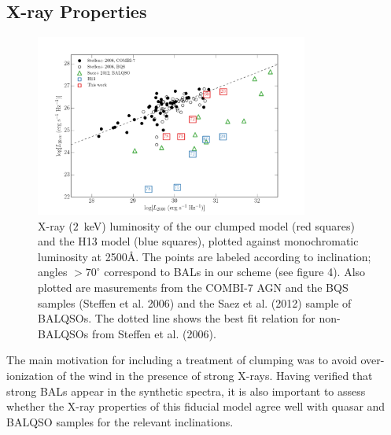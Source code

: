 \documentclass[useAMS,usenatbib]{mn2e_x}
\begin{document}


\subsection{X-ray Properties}
\label{sec:xray}


\begin{figure}
\centering
\includegraphics[width=0.8\textwidth]{figures/lx_a05_pre.png}
\caption
{
X-ray ($2$~keV) luminosity of the our clumped model (red squares) 
and the H13 model (blue squares), plotted against monochromatic luminosity 
at 2500\AA. The points are labeled according to inclination; angles
$>70^\circ$ correspond to BALs in our scheme (see figure 4).
Also plotted are masurements from 
the COMBI-7 AGN and the BQS samples (Steffen et al. 2006) and the Saez et al. (2012) 
sample of BALQSOs. The dotted line shows the best fit relation for non-BALQSOs 
from Steffen et al. (2006).
}
\label{fig:xray}
\end{figure}

The main motivation for including a treatment of clumping was
to avoid over-ionization of the wind in the presence of strong X-rays. 
Having verified that strong BALs appear in the synthetic spectra,
it is also important to assess whether the X-ray properties of this
fiducial model agree well with quasar and BALQSO samples for the relevant
inclinations.
\end{document}
